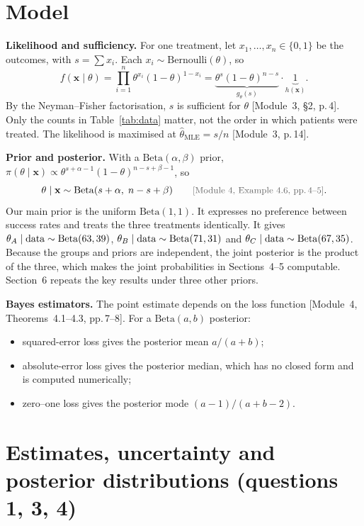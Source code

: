 \documentclass[11pt,a4paper]{article}
\newcommand{\Beta}{\mathrm{Beta}}
\newcommand{\tA}{\theta_A}
\newcommand{\tB}{\theta_B}
\newcommand{\tC}{\theta_C}
\newcommand{\course}[1]{\textcolor{black!60}{\small[#1]}}
\begin{document}
\section{Model}

\textbf{Likelihood and sufficiency.} For one treatment, let $x_1,\dots,x_n\in\{0,1\}$ be the
outcomes, with $s=\sum x_i$. Each $x_i\sim\mathrm{Bernoulli}(\theta)$, so
\[
f(\mathbf{x}\mid\theta)=\prod_{i=1}^{n}\theta^{x_i}(1-\theta)^{1-x_i}
=\underbrace{\theta^{s}(1-\theta)^{n-s}}_{g_\theta(s)}\cdot\underbrace{1}_{h(\mathbf{x})}.
\]
By the Neyman--Fisher factorisation, $s$ is sufficient for $\theta$
\course{Module~3, \S2, p.\,4}. Only the counts in Table~\ref{tab:data} matter, not the order in
which patients were treated. The likelihood is maximised at $\hat\theta_{\text{MLE}}=s/n$
\course{Module~3, p.\,14}.

\textbf{Prior and posterior.} With a $\Beta(\alpha,\beta)$ prior,
$\pi(\theta\mid\mathbf{x})\propto\theta^{s+\alpha-1}(1-\theta)^{n-s+\beta-1}$, so
\[
\theta\mid\mathbf{x}\sim\Beta(s+\alpha,\;n-s+\beta)
\qquad\text{\course{Module~4, Example~4.6, pp.\,4--5}.}
\]
Our main prior is the uniform $\Beta(1,1)$. It expresses no preference between success rates and
treats the three treatments identically. It gives
$\tA\mid\text{data}\sim\Beta(\alphaA,\betaA)$, $\tB\mid\text{data}\sim\Beta(\alphaB,\betaB)$ and
$\tC\mid\text{data}\sim\Beta(\alphaC,\betaC)$. Because the groups and priors are independent, the
joint posterior is the product of the three, which makes the joint probabilities in
Sections~4--5 computable. Section~6 repeats the key results under three other priors.

\textbf{Bayes estimators.} The point estimate depends on the loss function
\course{Module~4, Theorems~4.1--4.3, pp.\,7--8}. For a $\Beta(a,b)$ posterior:
\begin{itemize}
\item squared-error loss gives the posterior mean $a/(a+b)$;
\item absolute-error loss gives the posterior median, which has no closed form and is computed numerically;
\item zero--one loss gives the posterior mode $(a-1)/(a+b-2)$.
\end{itemize}

\section{Estimates, uncertainty and posterior distributions (questions 1, 3, 4)}
\end{document}
